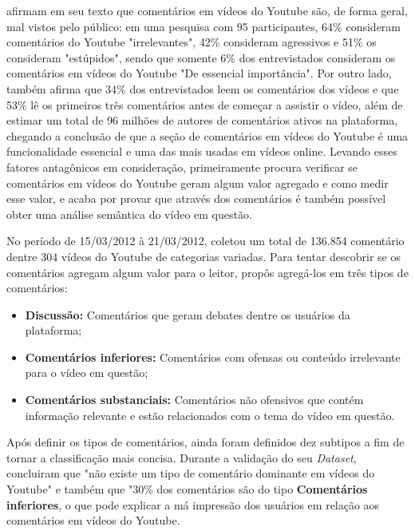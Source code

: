  afirmam em seu texto que comentários em vídeos do Youtube são, de forma geral, mal vistos pelo público: em uma pesquisa com 95 participantes, 64\% consideram comentários do Youtube "irrelevantes", 42\% consideram agressivos e 51\% os consideram "estúpidos", sendo que somente 6\% dos entrevistados consideram os comentários em vídeos do Youtube "De essencial importância". Por outro lado,  também afirma que 34\% dos entrevistados leem os comentários dos vídeos e que 53\% lê os primeiros três comentários antes de começar a assistir o vídeo, além de estimar um total de 96 milhões de autores de comentários ativos na plataforma, chegando a conclusão de que a seção de comentários em vídeos do Youtube é uma funcionalidade essencial e uma das mais usadas em vídeos online. Levando esses fatores antagônicos em consideração,  primeiramente procura verificar se comentários em vídeos do Youtube geram algum valor agregado e como medir esse valor, e acaba por provar que através dos comentários é também possível obter uma análise semântica do vídeo em questão. 

No período de 15/03/2012 à 21/03/2012,  coletou um total de 136.854 comentário dentre 304 vídeos do Youtube de categorias variadas. Para tentar descobrir se os comentários agregam algum valor para o leitor, propôs agregá-los em três tipos de comentários:
\begin{itemize}
    \item \textbf{Discussão:} Comentários que geram debates dentre os usuários da plataforma;
    \item \textbf{Comentários inferiores:} Comentários com ofensas ou conteúdo irrelevante para o vídeo em questão; 
   \item \textbf{Comentários substanciais:} Comentários não ofensivos que contém informação relevante e estão relacionados com o tema do vídeo em questão.
\end{itemize}
Após definir os tipos de comentários, ainda foram definidos dez subtipos a fim de tornar a classificação mais concisa. %
Durante a validação do seu \textit{Dataset},  concluiram que "não existe um tipo de comentário dominante em vídeos do Youtube" e também que "30\% dos comentários são do tipo \textbf{Comentários inferiores}, o que pode explicar a má impressão dos usuários em relação aos comentários em vídeos do Youtube.

